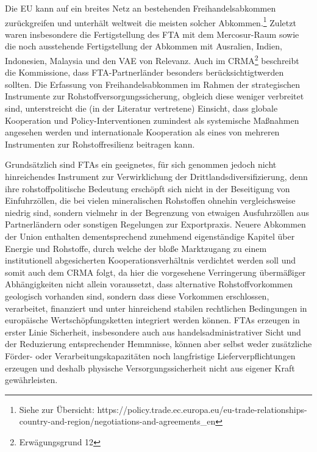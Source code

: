 \documentclass[12pt,a4paper,oneside]{book} %
\begin{document}
Die EU kann auf ein breites Netz an bestehenden Freihandelsabkommen zurückgreifen und unterhält weltweit die meisten solcher Abkommen.\footnote{Siehe zur Übersicht: https://policy.trade.ec.europa.eu/eu-trade-relationships-country-and-region/negotiations-and-agreements_en} Zuletzt waren insbesondere die Fertigstellung des FTA mit dem Mercosur-Raum sowie die noch ausstehende Fertigstellung der Abkommen mit Ausralien, Indien, Indonesien, Malaysia und den VAE von Relevanz. Auch im CRMA\footnote{Erwägungsgrund 12} beschreibt die Kommissione, dass FTA-Partnerländer \glqq besonders berücksichtigt\grqq werden sollten. Die Erfassung von Freihandelsabkommen im Rahmen der strategischen Instrumente zur Rohstoffversorgungssicherung, obgleich diese weniger verbreitet sind, unterstreicht die (in der Literatur vertretene) Einsicht, dass globale Kooperation und Policy-Interventionen zumindest als systemische Maßnahmen angesehen werden und internationale Kooperation als eines von mehreren Instrumenten zur Rohstoffresilienz beitragen kann.\autocite{Resilience of Critical Minerals Supply Chain, S. 11}

Grundsätzlich sind FTAs ein geeignetes, für sich genommen jedoch nicht hinreichendes Instrument zur Verwirklichung der Drittlandsdiversifizierung, denn ihre rohstoffpolitische Bedeutung erschöpft sich nicht in der Beseitigung von Einfuhrzöllen, die bei vielen mineralischen Rohstoffen ohnehin vergleichsweise niedrig sind, sondern vielmehr in der Begrenzung von etwaigen Ausfuhrzöllen aus Partnerländern oder sonstigen Regelungen zur Exportpraxis. Neuere Abkommen der Union enthalten dementsprechend zunehmend eigenständige Kapitel über Energie und Rohstoffe, durch welche der bloße Marktzugang zu einem institutionell abgesicherten Kooperationsverhältnis verdichtet werden soll und somit auch dem CRMA folgt, da hier die vorgesehene Verringerung übermäßiger Abhängigkeiten nicht allein voraussetzt, dass alternative Rohstoffvorkommen geologisch vorhanden sind, sondern dass diese Vorkommen erschlossen, verarbeitet, finanziert und unter hinreichend stabilen rechtlichen Bedingungen in europäische Wertschöpfungsketten integriert werden können. FTAs erzeugen in erster Linie Sicherheit, insbesondere auch aus handelsadministrativer Sicht und der Reduzierung entsprechender Hemmnisse, können aber selbst weder zusätzliche Förder- oder Verarbeitungskapazitäten noch langfristige Lieferverpflichtungen erzeugen und deshalb physische Versorgungssicherheit nicht aus eigener Kraft gewährleisten.
\end{document}
